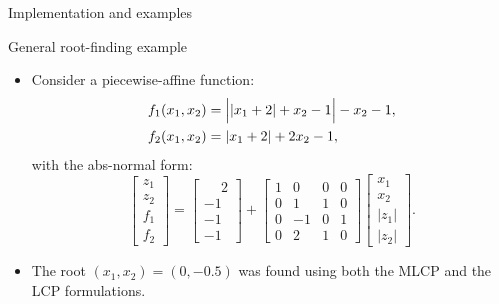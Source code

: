 \documentclass[10pt]{beamer}
\begin{document}
\begin{frame}{Implementation and examples}
{  \begin{block}{General root-finding example}
    \begin{itemize}
    \item Consider a piecewise-affine function:
    \begin{align*}
        &f_1(x_1,x_2) = \Bigl|\left|x_1+2\right|+x_2-1\Bigr| - x_2 -1,\\
        &f_2(x_1,x_2) = \left|x_1+2\right| + 2x_2-1,
    \end{align*}
    with the abs-normal form:
    \[
    \begin{bmatrix}
      z_1 \\ z_2 \\ f_1 \\f_2
    \end{bmatrix}
    =
    \begin{bmatrix}
      \phantom{-} 2 \\ -1 \\ -1 \\ -1
    \end{bmatrix}
    +
    \begin{bmatrix}
      1 & 0 & 0 & 0 \\
      0 & 1 & 1 & 0 \\
      0 & -1 & 0 & 1 \\
      0 & 2 & 1 & 0 
    \end{bmatrix}
    \begin{bmatrix}
      x_1 \\ x_2 \\ |z_1| \\ |z_2|
    \end{bmatrix}.
    \]
    \item The root $(x_1,x_2)=(0,-0.5)$ was found using both the MLCP and the LCP formulations.
    \end{itemize}
  \end{block}
    }
\end{frame}
\end{document}
